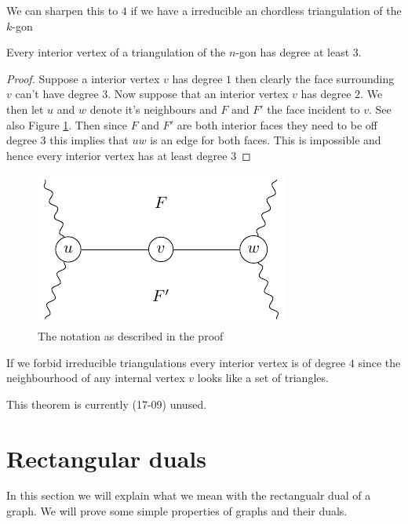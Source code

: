 \note We can sharpen this to $4$ if we have a irreducible an chordless triangulation of the $k$-gon

\begin{thrm} 
Every interior vertex of a triangulation of the $n$-gon has degree at least $3$.
\end{thrm}
\begin{proof}
Suppose a interior vertex $v$ has degree $1$ then clearly the face surrounding $v$ can't have degree $3$. Now suppose that an interior vertex $v$ has degree $2$. We then let $u$ and $w$ denote it's neighbours and $F$ and $F'$ the face incident to $v$. See also Figure \ref{fig:interiorVertexDegree3}. Then since $F$ and $F'$ are both interior faces they need to be off degree $3$ this implies that $uw$ is an edge for both faces. This is impossible and hence every interior vertex has at least degree $3$
\end{proof}

\begin{figure}[h!]
\centering
\includegraphics{prelim/img/interiorVertexDegree3.pdf}
\caption{The notation as described in the proof \label{fig:interiorVertexDegree3}
}
\end{figure}

\note If we forbid irreducible triangulations every interior vertex is of degree $4$ since the neighbourhood of any internal vertex $v$ looks like a set of triangles.

\note This theorem is currently (17-09) unused.




\section{Rectangular duals}

\newcommand{\G}{\scr G}
\renewcommand{\L}{\scr L}

In this section we will explain what we mean with the rectangualr dual of a graph. We will prove some simple properties of graphs and their duals.

